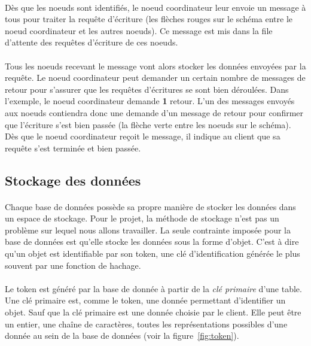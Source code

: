 \documentclass[12pt]{article}
\begin{document}
\paragraph{} Dès que les noeuds sont identifiés, le noeud coordinateur leur envoie un message à tous pour traiter la requête d'écriture (les flèches rouges sur le schéma entre le noeud coordinateur et les autres noeuds). Ce message est mis dans la file d'attente des requêtes d'écriture de ces noeuds.

\paragraph{} Tous les noeuds recevant le message vont alors stocker les données envoyées par la requête. Le noeud coordinateur peut demander un certain nombre de messages de retour pour s'assurer que les requêtes d'écritures se sont bien déroulées. Dans l'exemple, le noeud coordinateur demande \textbf{1} retour. L'un des messages envoyés aux noeuds contiendra donc une demande d'un message de retour pour confirmer que l'écriture s'est bien passée (la flèche verte entre les noeuds sur le schéma). Dès que le noeud coordinateur reçoit le message, il indique au client que sa requête s'est terminée et bien passée.

\subsection{Stockage des données}

\paragraph{} Chaque base de données possède sa propre manière de stocker les données dans un espace de stockage. Pour le projet, la méthode de stockage n'est pas un problème sur lequel nous allons travailler. La seule contrainte imposée pour la base de données est qu'elle stocke les données sous la forme d'objet. C'est à dire qu'un objet est identifiable par son token, une clé d'identification générée le plus souvent par une fonction de hachage.

\paragraph{} Le token est généré par la base de donnée à partir de la \textit{clé primaire} d'une table. Une clé primaire est, comme le token, une donnée permettant d'identifier un objet. Sauf que la clé primaire est une donnée choisie par le client. Elle peut être un entier, une chaîne de caractères, toutes les représentations possibles d'une donnée au sein de la base de données (voir la figure~\ref{fig:token}).
\end{document}
